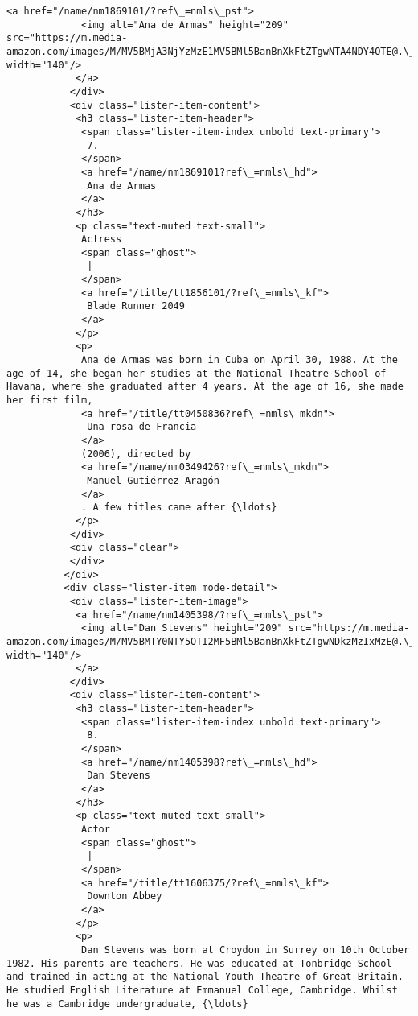 \documentclass[11pt]{article}
\begin{document}
\begin{Verbatim}[commandchars=\\\{\}]
            <a href="/name/nm1869101/?ref\_=nmls\_pst">
             <img alt="Ana de Armas" height="209" src="https://m.media-amazon.com/images/M/MV5BMjA3NjYzMzE1MV5BMl5BanBnXkFtZTgwNTA4NDY4OTE@.\_V1\_UX140\_CR0,0,140,209\_AL\_.jpg" width="140"/>
            </a>
           </div>
           <div class="lister-item-content">
            <h3 class="lister-item-header">
             <span class="lister-item-index unbold text-primary">
              7.
             </span>
             <a href="/name/nm1869101?ref\_=nmls\_hd">
              Ana de Armas
             </a>
            </h3>
            <p class="text-muted text-small">
             Actress
             <span class="ghost">
              |
             </span>
             <a href="/title/tt1856101/?ref\_=nmls\_kf">
              Blade Runner 2049
             </a>
            </p>
            <p>
             Ana de Armas was born in Cuba on April 30, 1988. At the age of 14, she began her studies at the National Theatre School of Havana, where she graduated after 4 years. At the age of 16, she made her first film,
             <a href="/title/tt0450836?ref\_=nmls\_mkdn">
              Una rosa de Francia
             </a>
             (2006), directed by
             <a href="/name/nm0349426?ref\_=nmls\_mkdn">
              Manuel Gutiérrez Aragón
             </a>
             . A few titles came after {\ldots}
            </p>
           </div>
           <div class="clear">
           </div>
          </div>
          <div class="lister-item mode-detail">
           <div class="lister-item-image">
            <a href="/name/nm1405398/?ref\_=nmls\_pst">
             <img alt="Dan Stevens" height="209" src="https://m.media-amazon.com/images/M/MV5BMTY0NTY5OTI2MF5BMl5BanBnXkFtZTgwNDkzMzIxMzE@.\_V1\_UY209\_CR5,0,140,209\_AL\_.jpg" width="140"/>
            </a>
           </div>
           <div class="lister-item-content">
            <h3 class="lister-item-header">
             <span class="lister-item-index unbold text-primary">
              8.
             </span>
             <a href="/name/nm1405398?ref\_=nmls\_hd">
              Dan Stevens
             </a>
            </h3>
            <p class="text-muted text-small">
             Actor
             <span class="ghost">
              |
             </span>
             <a href="/title/tt1606375/?ref\_=nmls\_kf">
              Downton Abbey
             </a>
            </p>
            <p>
             Dan Stevens was born at Croydon in Surrey on 10th October 1982. His parents are teachers. He was educated at Tonbridge School and trained in acting at the National Youth Theatre of Great Britain. He studied English Literature at Emmanuel College, Cambridge. Whilst he was a Cambridge undergraduate, {\ldots}

\end{Verbatim}
\end{document}
